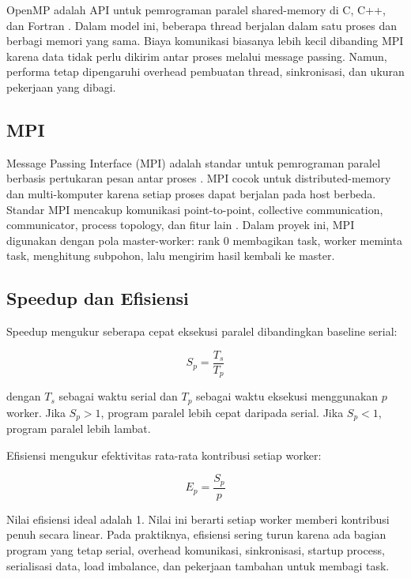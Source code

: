 \documentclass[conference]{IEEEtran}
\begin{document}
OpenMP adalah API untuk pemrograman paralel shared-memory di C, C++, dan Fortran \cite{openmp}. Dalam model ini, beberapa thread berjalan dalam satu proses dan berbagi memori yang sama. Biaya komunikasi biasanya lebih kecil dibanding MPI karena data tidak perlu dikirim antar proses melalui message passing. Namun, performa tetap dipengaruhi overhead pembuatan thread, sinkronisasi, dan ukuran pekerjaan yang dibagi.

\subsection{MPI}

Message Passing Interface (MPI) adalah standar untuk pemrograman paralel berbasis pertukaran pesan antar proses \cite{mpiforum}. MPI cocok untuk distributed-memory dan multi-komputer karena setiap proses dapat berjalan pada host berbeda. Standar MPI mencakup komunikasi point-to-point, collective communication, communicator, process topology, dan fitur lain \cite{mpistandard}. Dalam proyek ini, MPI digunakan dengan pola master-worker: rank 0 membagikan task, worker meminta task, menghitung subpohon, lalu mengirim hasil kembali ke master.

\subsection{Speedup dan Efisiensi}

Speedup mengukur seberapa cepat eksekusi paralel dibandingkan baseline serial:

\begin{equation}
S_p = \frac{T_s}{T_p}
\end{equation}

dengan \(T_s\) sebagai waktu serial dan \(T_p\) sebagai waktu eksekusi menggunakan \(p\) worker. Jika \(S_p > 1\), program paralel lebih cepat daripada serial. Jika \(S_p < 1\), program paralel lebih lambat.

Efisiensi mengukur efektivitas rata-rata kontribusi setiap worker:

\begin{equation}
E_p = \frac{S_p}{p}
\end{equation}

Nilai efisiensi ideal adalah 1. Nilai ini berarti setiap worker memberi kontribusi penuh secara linear. Pada praktiknya, efisiensi sering turun karena ada bagian program yang tetap serial, overhead komunikasi, sinkronisasi, startup process, serialisasi data, load imbalance, dan pekerjaan tambahan untuk membagi task.
\end{document}
